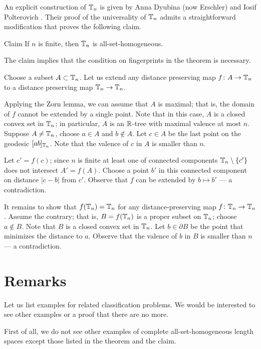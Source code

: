 \documentclass[a4paper,10pt]{article}
\begin{document}
An explicit construction of $\mathbb{T}_n$ is given by Anna Dyubina (now Erschler) and Iosif Polterovich \cite{dyubina-polterovich}.
Their proof of the universality of $\mathbb{T}_n$ admits a straightforward modification that proves the following claim. 

\begin{thm}{Claim}
If $n$ is finite, then $\mathbb{T}_n$ is all-set-homogeneous.
\end{thm}

The claim implies that the condition on fingerprints in the theorem is necessary.

Choose a subset $A\subset \mathbb{T}_n$. 
Let us extend any distance preserving map $f\colon A\to \mathbb{T}_n$ to a distance preserving map $\mathbb{T}_n\to \mathbb{T}_n$.

Applying the Zorn lemma, we can assume that $A$ is maximal; that is, the domain of $f$ cannot be extended by a single point.
Note that in this case, $A$ is a closed convex set in $\mathbb{T}_n$; in particular, $A$ is an $\mathbb{R}$-tree with maximal valence at most $n$.
Suppose $A\ne \mathbb{T}_n$, choose $a\in A$ and $b\notin A$. 
Let $c\in A$ be the last point on the geodesic $[ab]_{\mathbb{T}_n}$.
Note that the valence of $c$ in $A$ is smaller than $n$.

Let $c'=f(c)$; since $n$ is finite at least one of connected components $\mathbb{T}_n\setminus \{c'\}$ does not intersect $A'=f(A)$.
Choose a point $b'$ in this connected component on distance $|c-b|$ from $c'$.
Observe that $f$ can be extended by $b\mapsto b'$ --- a contradiction.

It remains to show that $f(\mathbb{T}_n)=\mathbb{T}_n$ for any distance-preserving map $f\:\TT_n\z\to \TT_n$.
Assume the contrary; that is, $B=f(\mathbb{T}_n)$ is a proper subset on $\mathbb{T}_n$;
choose $a\notin B$.
Note that $B$ is a closed convex set in $\mathbb{T}_n$.
Let $b\in \partial B$ be the point that minimizes the distance to $a$.
Observe that the valence of $b$ in $B$ is smaller than $n$ --- a contradiction.
\qeds

\section{Remarks}


Let us list examples for related classification problems.
We would be interested to see other examples or a proof that there are no more. 

First of all, we do not see other examples of complete all-set-homogeneous length spaces except those listed in the theorem and the claim.
\end{document}
